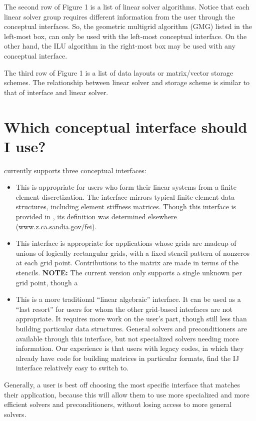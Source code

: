The second row of Figure 1 is a list of linear solver algorithms.   Notice that
each linear solver group requires different information from the user through
the conceptual interfaces.  So, the geometric multigrid algorithm (GMG) listed
in the left-most box, can only be used with the left-most conceptual
interface.  On the other hand, the ILU algorithm in the right-most box may be
used with any conceptual interface. 

The third row of Figure 1 is a list of data layouts or matrix/vector storage
schemes.  The relationship between linear solver and storage scheme is similar
to that of interface and linear solver.


\section{Which conceptual interface should I use?}

\hypre currently supports three conceptual interfaces:

\begin{itemize}

\item
{}
This is appropriate for users who form their linear systems from
a finite element discretization.
The interface mirrors typical finite element data structures,
including element stiffness matrices.
Though this interface is provided in \hypre{}, its definition
was determined elsewhere (www.z.ca.sandia.gov/fei).

\item
{}
This interface is appropriate for applications whose grids are 
madeup of unions of logically rectangular grids, with a fixed
stencil pattern of nonzeros at each grid point.
Contributions to the matrix are made in terms of the stencils.
{\bf NOTE:} The current version only supports a single unknown
per grid point, though a 

\item
{}
This is a more traditional ``linear algebraic'' interface. 
It can be used as a ``last resort'' for users for whom the other
grid-based interfaces are not appropriate.
It requires more work on the user's part, though still less than
building particular data structures.
General solvers and preconditioners are available through this
interface, but not specialized solvers needing more information.
Our experience is that users with legacy codes, in which they already
have code for building matrices in particular formats, find the
IJ interface relatively easy to switch to.

\end{itemize}

Generally, a user is best off choosing the most specific interface
that matches their application, because this will allow them
to use more specialized and more efficient solvers and preconditioners,
without losing access to more general solvers.